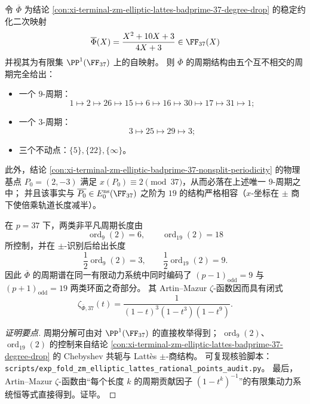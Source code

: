 \begin{conclusion}\label{con:xi-terminal-zm-elliptic-badprime-37-cycle-spectrum}
令 \(\overline{\Phi}\) 为结论 \ref{con:xi-terminal-zm-elliptic-lattes-badprime-37-degree-drop} 的稳定约化二次映射
\[
\overline{\Phi}(X)=\frac{X^{2}+10X+3}{4X+3}\in \FF_{37}(X)
\]
并视其为有限集 \(\PP^{1}(\FF_{37})\) 上的自映射。
则 \(\overline{\Phi}\) 的周期结构由五个互不相交的周期完全给出：
\begin{itemize}
  \item 一个 \(9\)-周期：
  \[
  1\mapsto 2\mapsto 26\mapsto 15\mapsto 6\mapsto 16\mapsto 30\mapsto 17\mapsto 31\mapsto 1;
  \]
  \item 一个 \(3\)-周期：
  \[
  3\mapsto 25\mapsto 29\mapsto 3;
  \]
  \item 三个不动点：\(\{5\},\{22\},\{\infty\}\)。
\end{itemize}
此外，结论 \ref{con:xi-terminal-zm-elliptic-badprime-37-nonsplit-periodicity} 的物理基点 \(P_{0}=(2,-3)\) 满足 \(x(P_{0})\equiv 2\pmod{37}\)，从而必落在上述唯一 \(9\)-周期之中；
并且该事实与 \(\overline{P_{0}}\in E_{0}^{\mathrm{ns}}(\FF_{37})\) 之阶为 \(19\) 的结构严格相容（\(x\)-坐标在 \(\pm\) 商下使倍乘轨道长度减半）。
\par
在 \(p=37\) 下，两类非平凡周期长度由
\[
\operatorname{ord}_{9}(2)=6,\qquad \operatorname{ord}_{19}(2)=18
\]
所控制，并在 \(\pm\)-识别后给出长度
\[
\frac{1}{2}\operatorname{ord}_{9}(2)=3,\qquad \frac{1}{2}\operatorname{ord}_{19}(2)=9.
\]
因此 \(\overline{\Phi}\) 的周期谱在同一有限动力系统中同时编码了 \((p-1)_{\mathrm{odd}}=9\) 与 \((p+1)_{\mathrm{odd}}=19\) 两类环面之奇部分。
其 Artin--Mazur \(\zeta\)-函数因而具有闭式
\[
\zeta_{\overline{\Phi},37}(t)=\frac{1}{(1-t)^{3}(1-t^{3})(1-t^{9})}.
\]
\end{conclusion}
\begin{proof}[证明要点]
周期分解可由对 \(\PP^{1}(\FF_{37})\) 的直接枚举得到；
\(\operatorname{ord}_{9}(2)\)、\(\operatorname{ord}_{19}(2)\) 的控制来自结论 \ref{con:xi-terminal-zm-elliptic-lattes-badprime-37-degree-drop} 的 Chebyshev 共轭与 Latt\`es \(\pm\)-商结构。
可复现核验脚本：\texttt{scripts/exp\_fold\_zm\_elliptic\_lattes\_rational\_points\_audit.py}。
最后，Artin--Mazur \(\zeta\)-函数由“每个长度 \(k\) 的周期贡献因子 \((1-t^{k})^{-1}\)”的有限集动力系统恒等式直接得到。证毕。
\end{proof}
